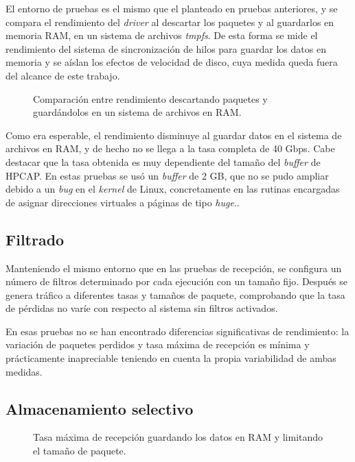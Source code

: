 \documentclass[oneside, draft]{epstfg}
\begin{document}
El entorno de pruebas es el mismo que el planteado en pruebas anteriores, y se compara el rendimiento del \textit{driver} al descartar los paquetes y al guardarlos en memoria RAM, en un sistema de archivos \textit{tmpfs}. De esta forma se mide el rendimiento del sistema de sincronización de hilos para guardar los datos en memoria y se aíslan los efectos de velocidad de disco, cuya medida queda fuera del alcance de este trabajo.

\begin{figure}[hbtp]
\caption{Comparación entre rendimiento descartando paquetes y guardándolos en un sistema de archivos en RAM.}
\label{fig:Validacion:DiskStore}
\end{figure}

Como era esperable, el rendimiento disminuye al guardar datos en el sistema de archivos en RAM, y de hecho no se llega a la tasa completa de 40 Gbps. Cabe destacar que la tasa obtenida es muy dependiente del tamaño del \textit{buffer} de HPCAP. En estas pruebas se usó un \textit{buffer} de 2 GB, que no se pudo ampliar debido a un \textit{bug} en el \textit{kernel} de Linux, concretamente en las rutinas encargadas de asignar direcciones virtuales a páginas de tipo \textit{huge}..

\subsection{Filtrado}

Manteniendo el mismo entorno que en las pruebas de recepción, se configura un número de filtros determinado por cada ejecución con un tamaño fijo. Después se genera tráfico a diferentes tasas y tamaños de paquete, comprobando que la tasa de pérdidas no varíe con respecto al sistema sin filtros activados.

En esas pruebas no se han encontrado diferencias significativas de rendimiento: la variación de paquetes perdidos y tasa máxima de recepción es mínima y prácticamente inapreciable teniendo en cuenta la propia variabilidad de ambas medidas.

\subsection{Almacenamiento selectivo}

\begin{figure}[hbtp]
\caption[Tasa máxima experimental limitando el tamaño de paquete]{Tasa máxima de recepción guardando los datos en RAM y limitando el tamaño de paquete.}
\label{fig:Validacion:CaplenEffects}
\end{figure}
\end{document}
